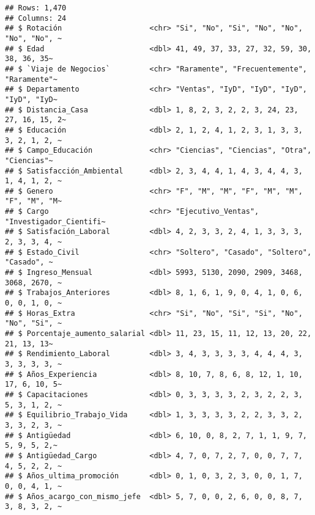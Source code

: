 \documentclass[
]{article}
\begin{document}
\begin{verbatim}
## Rows: 1,470
## Columns: 24
## $ Rotación                    <chr> "Si", "No", "Si", "No", "No", "No", "No", ~
## $ Edad                        <dbl> 41, 49, 37, 33, 27, 32, 59, 30, 38, 36, 35~
## $ `Viaje de Negocios`         <chr> "Raramente", "Frecuentemente", "Raramente"~
## $ Departamento                <chr> "Ventas", "IyD", "IyD", "IyD", "IyD", "IyD~
## $ Distancia_Casa              <dbl> 1, 8, 2, 3, 2, 2, 3, 24, 23, 27, 16, 15, 2~
## $ Educación                   <dbl> 2, 1, 2, 4, 1, 2, 3, 1, 3, 3, 3, 2, 1, 2, ~
## $ Campo_Educación             <chr> "Ciencias", "Ciencias", "Otra", "Ciencias"~
## $ Satisfacción_Ambiental      <dbl> 2, 3, 4, 4, 1, 4, 3, 4, 4, 3, 1, 4, 1, 2, ~
## $ Genero                      <chr> "F", "M", "M", "F", "M", "M", "F", "M", "M~
## $ Cargo                       <chr> "Ejecutivo_Ventas", "Investigador_Cientifi~
## $ Satisfación_Laboral         <dbl> 4, 2, 3, 3, 2, 4, 1, 3, 3, 3, 2, 3, 3, 4, ~
## $ Estado_Civil                <chr> "Soltero", "Casado", "Soltero", "Casado", ~
## $ Ingreso_Mensual             <dbl> 5993, 5130, 2090, 2909, 3468, 3068, 2670, ~
## $ Trabajos_Anteriores         <dbl> 8, 1, 6, 1, 9, 0, 4, 1, 0, 6, 0, 0, 1, 0, ~
## $ Horas_Extra                 <chr> "Si", "No", "Si", "Si", "No", "No", "Si", ~
## $ Porcentaje_aumento_salarial <dbl> 11, 23, 15, 11, 12, 13, 20, 22, 21, 13, 13~
## $ Rendimiento_Laboral         <dbl> 3, 4, 3, 3, 3, 3, 4, 4, 4, 3, 3, 3, 3, 3, ~
## $ Años_Experiencia            <dbl> 8, 10, 7, 8, 6, 8, 12, 1, 10, 17, 6, 10, 5~
## $ Capacitaciones              <dbl> 0, 3, 3, 3, 3, 2, 3, 2, 2, 3, 5, 3, 1, 2, ~
## $ Equilibrio_Trabajo_Vida     <dbl> 1, 3, 3, 3, 3, 2, 2, 3, 3, 2, 3, 3, 2, 3, ~
## $ Antigüedad                  <dbl> 6, 10, 0, 8, 2, 7, 1, 1, 9, 7, 5, 9, 5, 2,~
## $ Antigüedad_Cargo            <dbl> 4, 7, 0, 7, 2, 7, 0, 0, 7, 7, 4, 5, 2, 2, ~
## $ Años_ultima_promoción       <dbl> 0, 1, 0, 3, 2, 3, 0, 0, 1, 7, 0, 0, 4, 1, ~
## $ Años_acargo_con_mismo_jefe  <dbl> 5, 7, 0, 0, 2, 6, 0, 0, 8, 7, 3, 8, 3, 2, ~
\end{verbatim}
\end{document}

